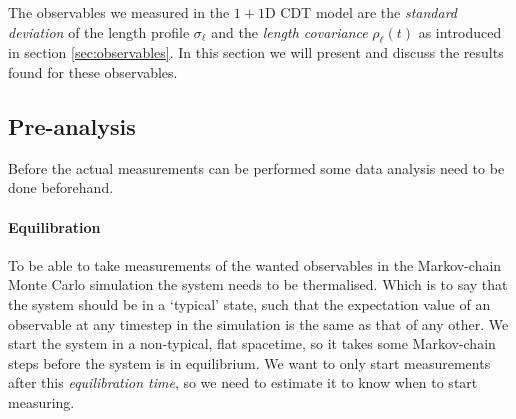 The observables we measured in the $1 + 1$D CDT model are the \emph{standard deviation} of the length profile $\sigma_\ell$ and the \emph{length covariance} $\rho_\ell(t)$ as introduced in section \ref{sec:observables}.
In this section we will present and discuss the results found for these observables.

\subsection{Pre-analysis}
Before the actual measurements can be performed some data analysis need to be done beforehand.

\paragraph{Equilibration}
To be able to take measurements of the wanted observables in the Markov-chain Monte Carlo simulation the system needs to be thermalised. Which is to say that the system should be in a `typical' state, such that the expectation value of an observable at any timestep in the simulation is the same as that of any other.
We start the system in a non-typical, flat spacetime, so it takes some Markov-chain steps before the system is in equilibrium.
We want to only start measurements after this \emph{equilibration time}, so we need to estimate it to know when to start measuring.

